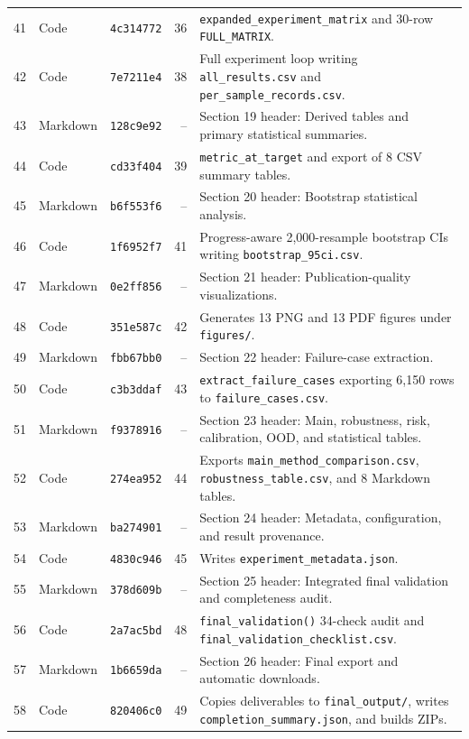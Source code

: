 \documentclass[11pt,a4paper]{article}
\begin{document}
\begin{small}
\begin{longtable}{r l l r L{0.50\textwidth}}
41 & Code & \texttt{4c314772} & 36 & \texttt{expanded\_\allowbreak{}experiment\_\allowbreak{}matrix} and 30-row \texttt{FULL\_\allowbreak{}MATRIX}. \\
42 & Code & \texttt{7e7211e4} & 38 & Full experiment loop writing \texttt{all\_\allowbreak{}results.\allowbreak{}csv} and \texttt{per\_\allowbreak{}sample\_\allowbreak{}records.\allowbreak{}csv}. \\
43 & Markdown & \texttt{128c9e92} & -- & Section 19 header: Derived tables and primary statistical summaries. \\
44 & Code & \texttt{cd33f404} & 39 & \texttt{metric\_\allowbreak{}at\_\allowbreak{}target} and export of 8 CSV summary tables. \\
45 & Markdown & \texttt{b6f553f6} & -- & Section 20 header: Bootstrap statistical analysis. \\
46 & Code & \texttt{1f6952f7} & 41 & Progress-aware 2,000-resample bootstrap CIs writing \texttt{bootstrap\_\allowbreak{}95ci.\allowbreak{}csv}. \\
47 & Markdown & \texttt{0e2ff856} & -- & Section 21 header: Publication-quality visualizations. \\
48 & Code & \texttt{351e587c} & 42 & Generates 13 PNG and 13 PDF figures under \texttt{figures/\allowbreak{}}. \\
49 & Markdown & \texttt{fbb67bb0} & -- & Section 22 header: Failure-case extraction. \\
50 & Code & \texttt{c3b3ddaf} & 43 & \texttt{extract\_\allowbreak{}failure\_\allowbreak{}cases} exporting 6,150 rows to \texttt{failure\_\allowbreak{}cases.\allowbreak{}csv}. \\
51 & Markdown & \texttt{f9378916} & -- & Section 23 header: Main, robustness, risk, calibration, OOD, and statistical tables. \\
52 & Code & \texttt{274ea952} & 44 & Exports \texttt{main\_\allowbreak{}method\_\allowbreak{}comparison.\allowbreak{}csv}, \texttt{robustness\_\allowbreak{}table.\allowbreak{}csv}, and 8 Markdown tables. \\
53 & Markdown & \texttt{ba274901} & -- & Section 24 header: Metadata, configuration, and result provenance. \\
54 & Code & \texttt{4830c946} & 45 & Writes \texttt{experiment\_\allowbreak{}metadata.\allowbreak{}json}. \\
55 & Markdown & \texttt{378d609b} & -- & Section 25 header: Integrated final validation and completeness audit. \\
56 & Code & \texttt{2a7ac5bd} & 48 & \texttt{final\_\allowbreak{}validation(\allowbreak{})} 34-check audit and \texttt{final\_\allowbreak{}validation\_\allowbreak{}checklist.\allowbreak{}csv}. \\
57 & Markdown & \texttt{1b6659da} & -- & Section 26 header: Final export and automatic downloads. \\
58 & Code & \texttt{820406c0} & 49 & Copies deliverables to \texttt{final\_\allowbreak{}output/\allowbreak{}}, writes \texttt{completion\_\allowbreak{}summary.\allowbreak{}json}, and builds ZIPs. \\
\end{longtable}
\end{small}
\end{document}
